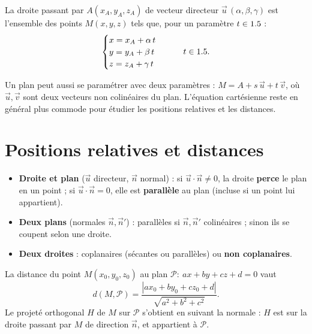 \begin{theoreme}
La droite passant par $A(x_A,y_A,z_A)$ de vecteur directeur $\vec u\,(\alpha,\beta,\gamma)$
est l'ensemble des points $M(x,y,z)$ tels que, pour un paramètre $t\in1.5$ :
\[
\begin{cases}
x=x_A+\alpha\,t\\
y=y_A+\beta\,t\\
z=z_A+\gamma\,t
\end{cases}\qquad t\in1.5.
\]
\end{theoreme}

\begin{remarque}
Un plan peut aussi se paramétrer avec deux paramètres : $M=A+s\,\vec u+t\,\vec v$, où
$\vec u,\vec v$ sont deux vecteurs non colinéaires du plan. L'équation cartésienne reste
en général plus commode pour étudier les positions relatives et les distances.
\end{remarque}

\section{Positions relatives et distances}

\begin{propriete}
\begin{itemize}
\item \textbf{Droite et plan} ($\vec u$ directeur, $\vec n$ normal) : si $\vec u\cdot\vec n\neq0$,
la droite \textbf{perce} le plan en un point ; si $\vec u\cdot\vec n=0$, elle est
\textbf{parallèle} au plan (incluse si un point lui appartient).
\item \textbf{Deux plans} (normales $\vec n,\vec n'$) : parallèles si $\vec n,\vec n'$ colinéaires ;
sinon ils se coupent selon une droite.
\item \textbf{Deux droites} : coplanaires (sécantes ou parallèles) ou \textbf{non coplanaires}.
\end{itemize}
\end{propriete}

\begin{theoreme}
La distance du point $M(x_0,y_0,z_0)$ au plan $\mathcal P:\ ax+by+cz+d=0$ vaut
\[
d(M,\mathcal P)=\frac{|a x_0+b y_0+c z_0+d|}{\sqrt{a^{2}+b^{2}+c^{2}}}.
\]
Le projeté orthogonal $H$ de $M$ sur $\mathcal P$ s'obtient en suivant la normale :
$H$ est sur la droite passant par $M$ de direction $\vec n$, et appartient à $\mathcal P$.
\end{theoreme}

